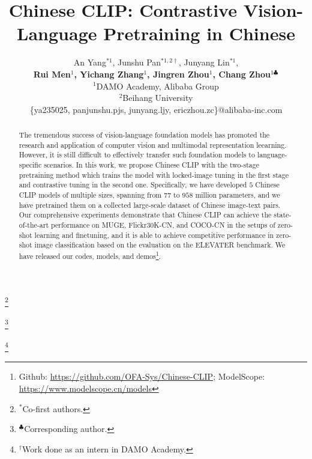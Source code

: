 \documentclass[11pt]{article}
\title{Chinese CLIP: Contrastive Vision-Language Pretraining in Chinese}
\author{An Yang$^{\ast1}$, Junshu Pan$^{\ast1,2\dagger}$, Junyang Lin$^{\ast1}$, \\
\textbf{Rui Men${^1}$, Yichang Zhang${^1}$, Jingren Zhou${^1}$, Chang Zhou$^{1\clubsuit}$ } \\
${^1}$DAMO Academy, Alibaba Group \\ 
${^2}$Beihang University \\
\{ya235025, panjunshu.pjs, junyang.ljy, ericzhou.zc\}@alibaba-inc.com
}
\begin{document}
\maketitle
\newcommand\blfootnote[1]{%
\begingroup
\renewcommand\thefootnote{}\footnote{#1}%
\addtocounter{footnote}{-1}%
\endgroup
}
\blfootnote{$^{\ast}$Co-first authors.}
\blfootnote{$^{\clubsuit}$Corresponding author. }
\blfootnote{$^{\dagger}$Work done as an intern in DAMO Academy.}

\begin{abstract}
The tremendous success of vision-language foundation models has promoted the research and application of computer vision and multimodal representation leearning. 
However, it is still difficult to effectively transfer such foundation models to language-specific scenarios. 
In this work, we propose Chinese CLIP with the two-stage pretraining method which trains the model with locked-image tuning in the first stage and contrastive tuning in the second one. 
Specifically, we have developed $5$ Chinese CLIP models of multiple sizes, spanning from $77$ to $958$ million parameters, and we have pretrained them on a collected large-scale dataset of Chinese image-text pairs. 
Our comprehensive experiments demonstrate that Chinese CLIP can achieve the state-of-the-art performance on MUGE, Flickr30K-CN, and COCO-CN in the setups of zero-shot learning and finetuning, and it is able to achieve competitive performance in zero-shot image classification based on the evaluation on the ELEVATER benchmark. 
We have released our codes, models, and demos\footnote{Github: \url{https://github.com/OFA-Sys/Chinese-CLIP}; ModelScope: \url{https://www.modelscope.cn/models}}. 
\end{abstract}












\end{document}
